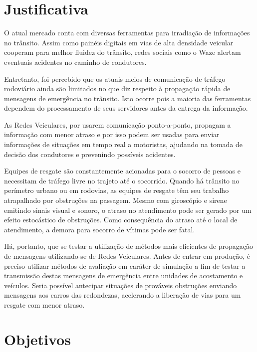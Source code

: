 \documentclass[
12pt,				%
openright,			%
oneside,			%
a4paper,			%
brazil,				%
]{abntex2}
\begin{document}
	
	\section{Justificativa}
	
	\par O atual mercado conta com diversas ferramentas para irradiação de informações no trânsito. Assim como painéis digitais em vias de alta densidade veicular cooperam para melhor fluidez do trânsito, redes sociais como o Waze alertam eventuais acidentes no caminho de condutores. 
	
	\par Entretanto, foi percebido que os atuais meios de comunicação de tráfego rodoviário ainda são limitados no que diz respeito à propagação rápida de mensagens de emergência no trânsito. Isto ocorre pois a maioria das ferramentas dependem do processamento de seus servidores antes da entrega da informação.
	
	\par As Redes Veiculares, por usarem comunicação ponto-a-ponto, propagam a informação com menor atraso e por isso podem ser usadas para enviar informações de situações em tempo real a motoristas, ajudando na tomada de decisão dos condutores e prevenindo possíveis acidentes.
	
	\par Equipes de resgate são constantemente acionadas para o socorro de pessoas e necessitam de tráfego livre no trajeto até o socorrido. Quando há trânsito no perímetro urbano ou em rodovias, as equipes de resgate têm seu trabalho atrapalhado por obstruções na passagem. Mesmo com giroscópio e sirene emitindo sinais visual e sonoro, o atraso no atendimento pode ser gerado por um efeito estocástico de obstruções. Como consequência do atraso até o local de atendimento, a demora para socorro de vítimas pode ser fatal.
	
	\par Há, portanto, que se testar a utilização de métodos mais eficientes de propagação de mensagens utilizando-se de Redes Veiculares. Antes de entrar em produção, é preciso utilizar métodos de avaliação em caráter de simulação a fim de testar a transmissão destas mensagens de emergência entre unidades de acostamento e veículos. Seria possível antecipar situações de prováveis obstruções enviando mensagens aos carros das redondezas, acelerando a liberação de vias para um resgate com menor atraso. 	
	
	\section{Objetivos}
	
\end{document}
